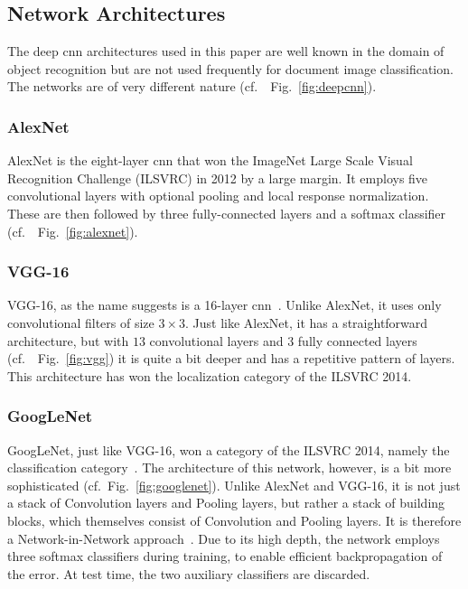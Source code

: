 \documentclass[conference]{IEEEtran}
\newcommand*{\cf}		{cf.\ }
\begin{document}
\subsection{Network Architectures}

The deep \ac{cnn} architectures used in this paper are well known in the domain of object recognition but are not used frequently for document image classification. The networks are of very different nature (\cf~Fig.~\ref{fig:deepcnn}).

\subsubsection{\textbf{AlexNet}}
AlexNet \cite{cnn_alexnet_nips2014} is the eight-layer \ac{cnn} that won the ImageNet Large Scale Visual Recognition Challenge (ILSVRC) in 2012 \cite{russakovsky2015imagenet} by a large margin.
It employs five convolutional layers with optional pooling and local response normalization. These are then followed by three fully-connected layers and a softmax classifier (\cf~Fig.~\ref{fig:alexnet}).

\subsubsection{\textbf{VGG-16}}
VGG-16, as the name suggests is a 16-layer \ac{cnn}~\cite{simonyan2014very}. Unlike AlexNet, it uses only convolutional filters of size $3\times3$. Just like AlexNet, it has a straightforward architecture, but with $13$ convolutional layers and $3$ fully connected layers (\cf~Fig.~\ref{fig:vgg}) it is quite a bit deeper and has a repetitive pattern of layers. This architecture has won the localization category of the ILSVRC 2014.

\subsubsection{\textbf{GoogLeNet}}
GoogLeNet, just like VGG-16, won a category of the ILSVRC 2014, namely the classification category~\cite{szegedy2015going}. The architecture of this network, however, is a bit more sophisticated (\cf Fig.~\ref{fig:googlenet}). Unlike AlexNet and VGG-16, it is not just a stack of Convolution layers and Pooling layers, but rather a stack of building blocks, which themselves consist of Convolution and Pooling layers. It is therefore a Network-in-Network approach~\cite{lin2013network}. Due to its high depth, the network employs three softmax classifiers during training, to enable efficient backpropagation of the error. At test time, the two auxiliary classifiers are discarded.
\end{document}
